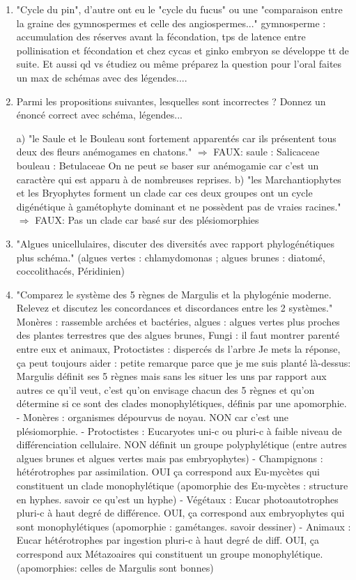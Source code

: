 \begin{enumerate}
	\item "Cycle du pin", d'autre ont eu le "cycle du fucus" ou une "comparaison entre la graine des gymnospermes et celle des angiospermes..." gymnosperme : accumulation des réserves avant la fécondation, tps de latence entre pollinisation et fécondation et chez cycas et ginko embryon se développe tt de suite.
 Et aussi qd vs étudiez ou même préparez la question pour l'oral faites un max de schémas avec des légendes....
 
 
	\item Parmi les propositions suivantes, lesquelles sont incorrectes ? Donnez un énoncé correct avec schéma, légendes... 

a) "le Saule et le Bouleau sont fortement apparentés car ils présentent tous deux des fleurs anémogames en chatons."
$\Rightarrow$ FAUX: saule : Salicaceae bouleau : Betulaceae On ne peut se baser sur anémogamie car c’est un caractère qui est apparu à de nombreuses reprises.
 b) "les Marchantiophytes et les Bryophytes forment un clade car ces deux groupes ont un cycle digénétique à gamétophyte dominant et ne possèdent pas de vraies racines."
$\Rightarrow$ FAUX: Pas un clade car basé sur des plésiomorphies

	\item "Algues unicellulaires, discuter des diversités avec rapport phylogénétiques plus schéma." (algues vertes : chlamydomonas ; algues brunes : diatomé, coccolithacés, Péridinien)

	\item "Comparez le système des 5 règnes de Margulis et la phylogénie moderne. Relevez et discutez les concordances et discordances entre les 2 systèmes."
 Monères : rassemble archées et bactéries, algues : algues vertes plus proches des plantes terrestres que des algues brunes, Fungi : il faut montrer parenté entre eux et animaux, Protoctistes : dispercés ds l’arbre
Je mets la réponse, ça peut toujours aider : petite remarque parce que je me suis planté là-dessus: Margulis définit ses 5 règnes mais sans les situer les uns par rapport aux autres ce qu'il veut, c'est qu'on envisage chacun des 5 règnes et qu'on détermine si ce sont des clades monophylétiques, définis par une apomorphie.
- Monères : organismes dépourvus de noyau. NON car c'est une plésiomorphie. 
- Protoctistes : Eucaryotes uni-c ou pluri-c à faible niveau de différenciation cellulaire. NON définit un groupe polyphylétique (entre autres algues brunes et algues vertes mais pas embryophytes)
- Champignons : hétérotrophes par assimilation. OUI ça correspond aux Eu-mycètes qui constituent un clade monophylétique (apomorphie des Eu-mycètes : structure en hyphes. savoir ce qu'est un hyphe)
- Végétaux : Eucar photoautotrophes pluri-c à haut degré de différence. OUI, ça correspond aux embryophytes qui sont monophylétiques (apomorphie : gamétanges. savoir dessiner)
- Animaux : Eucar hétérotrophes par ingestion pluri-c à haut degré de diff. OUI, ça correspond aux Métazoaires qui constituent un groupe monophylétique. (apomorphies: celles de Margulis sont bonnes)


\end{enumerate}
